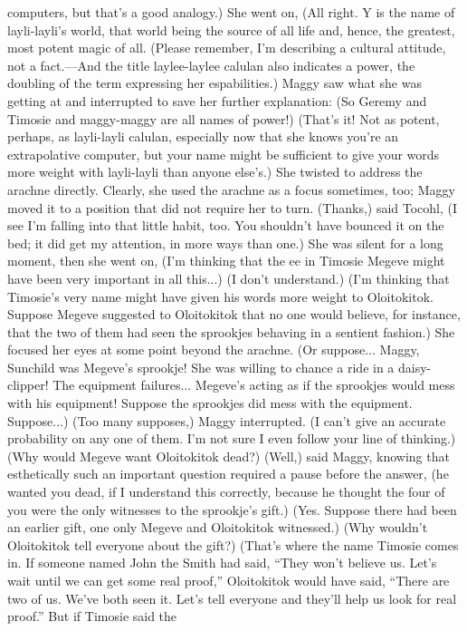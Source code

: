 \documentclass[9pt]{article}
\begin{document}
computers, but that’s a good analogy.)
She went on, (All right. Y is the name of layli-layli’s world, that world being the source of all life
and, hence, the greatest, most potent magic of all.
(Please remember, I’m describing a cultural attitude, not a fact.—And the title laylee-laylee calulan
also indicates a power, the doubling of the term expressing her espabilities.)
Maggy saw what she was getting at and interrupted to save her further explanation: (So Geremy and
Timosie and maggy-maggy are all names of power!)
(That’s it! Not as potent, perhaps, as layli-layli calulan, especially now that she knows you’re an
extrapolative computer, but your name might be sufficient to give your words more weight with layli-layli
than anyone else’s.)
She twisted to address the arachne directly. Clearly, she used the arachne as a focus sometimes, too;
Maggy moved it to a position that did not require her to turn.
(Thanks,) said Tocohl, (I see I’m falling into that little habit, too. You shouldn’t have bounced it on
the bed; it did get my attention, in more ways than one.) She was silent for a long moment, then she went
on, (I’m thinking that the ee in Timosie Megeve might have been very important in all this...)
(I don’t understand.)
(I’m thinking that Timosie’s very name might have given his words more weight to Oloitokitok.
Suppose Megeve suggested to Oloitokitok that no one would believe, for instance, that the two of them
had seen the sprookjes behaving in a sentient fashion.) She focused her eyes at some point beyond the
arachne. (Or suppose... Maggy, Sunchild was Megeve’s sprookje! She was willing to chance a ride in a
daisy-clipper! The equipment failures... Megeve’s acting as if the sprookjes would mess with his
equipment! Suppose the sprookjes did mess with the equipment. Suppose...)
(Too many supposes,) Maggy interrupted. (I can’t give an accurate probability on any one of them.
I’m not sure I even follow your line of thinking.)
(Why would Megeve want Oloitokitok dead?)
(Well,) said Maggy, knowing that esthetically such an important question required a pause before the
answer, (he wanted you dead, if I understand this correctly, because he thought the four of you were the
only witnesses to the sprookje’s gift.)
(Yes. Suppose there had been an earlier gift, one only Megeve and Oloitokitok witnessed.)
(Why wouldn’t Oloitokitok tell everyone about the gift?)
(That’s where the name Timosie comes in. If someone named John the Smith had said, “They won’t
believe us. Let’s wait until we can get some real proof,” Oloitokitok would have said, “There are two of
us. We’ve both seen it. Let’s tell everyone and they’ll help us look for real proof.” But if Timosie said the
\end{document}
